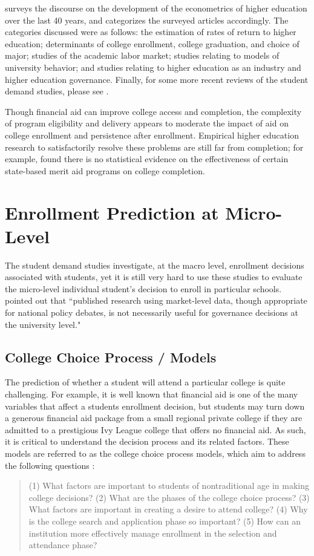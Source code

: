 \documentclass[12pt,english]{report}
\begin{document}
\citet{Ehrenberg2004} surveys the discourse on the development of the econometrics of higher education over the last 40 years, and categorizes the surveyed articles accordingly. The categories discussed were as follows: the estimation of rates of return to higher education; determinants of college enrollment, college graduation, and choice of major; studies of the  academic labor market; studies relating to models of university behavior; and studies relating to higher education as an industry and higher education governance.  Finally, for some more recent reviews of the student demand studies, please see \citep{Dynarski2002, Dynarski2003, Dynarski2000, Dynarski2013}.
% 
% 

Though financial aid can improve college access and completion, the complexity of program eligibility and delivery appears to moderate the impact of aid on college enrollment and persistence after enrollment. Empirical higher education research  to satisfactorily resolve these problems are still far from completion; for example, \citet{Winters2015} found there is no statistical evidence on the effectiveness of certain state-based merit aid programs on college completion.

\section{Enrollment Prediction at Micro-Level}
The student demand studies investigate, at the macro level, enrollment decisions associated with students, yet it is still very hard to use these studies to evaluate the micro-level individual student's decision to enroll in particular schools. \citet{Carter2011} pointed out that ``published research using market-level data, though appropriate for national policy debates, is not necessarily useful for governance decisions at the university level."

\subsection{College Choice Process / Models} 
The prediction of whether a student will attend a particular college is quite challenging.  For example,  it is well known that financial aid is one of the many variables that affect a students enrollment decision, but students may turn down a generous financial aid package from a small regional private college if they are admitted to a prestigious Ivy League college that offers no financial aid.  As such, it is critical to understand the decision process and its related factors. These models are referred to as the college choice process models, which aim to address the following questions \citep{Paulsen1990}:
\begin{quote}
(1) What factors are important to students of nontraditional age in making college decisions? (2) What are the phases of the college choice process? (3) What factors are important in creating a desire to attend college? (4) Why is the college search and application phase so important? (5) How can an institution more effectively manage enrollment in the selection and attendance phase?
\end{quote}
\end{document}
